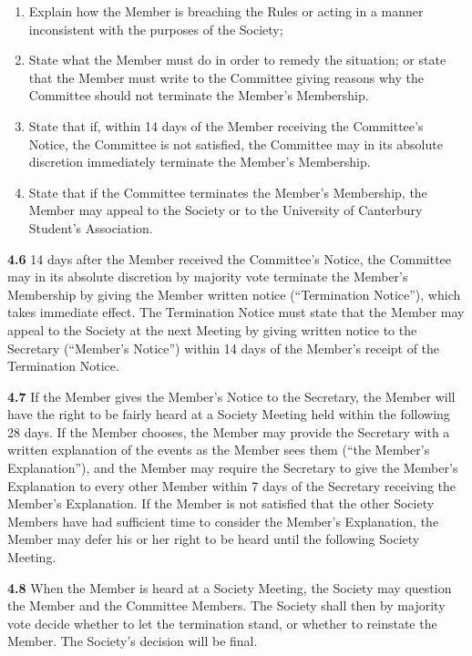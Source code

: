 \begin{enumerate}
  \item Explain how the Member is breaching the Rules or acting in a manner inconsistent with the purposes of the Society;
  \item State what the Member must do in order to remedy the situation; or state that the Member must write to the Committee giving reasons why the Committee should not terminate the Member’s Membership.
  \item State that if, within 14 days of the Member receiving the Committee’s Notice, the Committee is not satisfied, the Committee may in its absolute discretion immediately terminate the Member’s Membership.
  \item State that if the Committee terminates the Member’s Membership, the Member may appeal to the Society or to the University of Canterbury Student's Association.
\end{enumerate}

\textbf{4.6} 14 days after the Member received the Committee’s Notice, the Committee may in its absolute discretion by majority vote terminate the Member’s Membership by giving the Member written notice (``Termination Notice''), which takes immediate effect. The Termination Notice must state that the Member may appeal to the Society at the next Meeting by giving written notice to the Secretary (``Member’s Notice'') within 14 days of the Member’s receipt of the Termination Notice.

\textbf{4.7} If the Member gives the Member’s Notice to the Secretary, the Member will have the right to be fairly heard at a Society Meeting held within the following 28 days. If the Member chooses, the Member may provide the Secretary with a written explanation of the events as the Member sees them (``the Member’s Explanation''), and the Member may require the Secretary to give the Member’s Explanation to every other Member within 7 days of the Secretary receiving the Member’s Explanation. If the Member is not satisfied that the other Society Members have had sufficient time to consider the Member’s Explanation, the Member may defer his or her right to be heard until the following Society Meeting.

\textbf{4.8} When the Member is heard at a Society Meeting, the Society may question the Member and the Committee Members. The Society shall then by majority vote decide whether to let the termination stand, or whether to reinstate the Member. The Society’s decision will be final.

